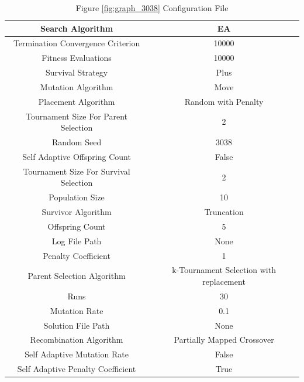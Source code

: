 \documentclass{standalone}
\begin{document}
\begin{table}[!htb]
	\centering
	\caption{Figure \ref{fig:graph_3038} Configuration File}
	\label{tab:graph_3038}
	\begin{tabular}{| c | c |}
		\hline
		Search Algorithm		& EA		 \\
		\hline
		Termination Convergence Criterion		& 10000		 \\
		\hline
		Fitness Evaluations		& 10000		 \\
		\hline
		Survival Strategy		& Plus		 \\
		\hline
		Mutation Algorithm		& Move		 \\
		\hline
		Placement Algorithm		& Random with Penalty		 \\
		\hline
		Tournament Size For Parent Selection		& 2		 \\
		\hline
		Random Seed		& 3038		 \\
		\hline
		Self Adaptive Offspring Count		& False		 \\
		\hline
		Tournament Size For Survival Selection		& 2		 \\
		\hline
		Population Size		& 10		 \\
		\hline
		Survivor Algorithm		& Truncation		 \\
		\hline
		Offspring Count		& 5		 \\
		\hline
		Log File Path		& None		 \\
		\hline
		Penalty Coefficient		& 1		 \\
		\hline
		Parent Selection Algorithm		& k-Tournament Selection with replacement		 \\
		\hline
		Runs		& 30		 \\
		\hline
		Mutation Rate		& 0.1		 \\
		\hline
		Solution File Path		& None		 \\
		\hline
		Recombination Algorithm		& Partially Mapped Crossover		 \\
		\hline
		Self Adaptive Mutation Rate		& False		 \\
		\hline
		Self Adaptive Penalty Coefficient		& True		 \\
		\hline
	\end{tabular}
\end{table}
\end{document}
